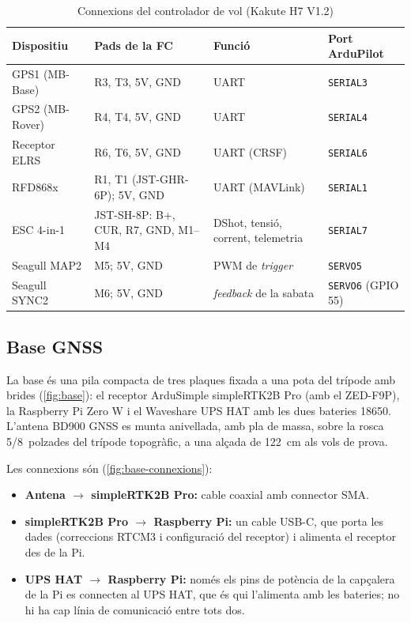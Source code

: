 \begin{table}[H]
    \centering
    \caption{Connexions del controlador de vol (Kakute H7 V1.2)}
    \label{tab:connexions}
    \small
    \begin{tabular}{P{3.2cm}P{3.9cm}P{3.5cm}P{2.6cm}}
        \toprule
        Dispositiu & Pads de la FC & Funció & Port ArduPilot \\
        \midrule
        GPS1 (MB-Base) & R3, T3, 5V, GND & UART & \texttt{SERIAL3} \\
        GPS2 (MB-Rover) & R4, T4, 5V, GND & UART & \texttt{SERIAL4} \\
        Receptor ELRS & R6, T6, 5V, GND & UART (CRSF) & \texttt{SERIAL6} \\
        RFD868x & R1, T1 (JST-GHR-6P); 5V, GND & UART (MAVLink) & \texttt{SERIAL1} \\
        ESC 4-in-1 & JST-SH-8P: B+, CUR, R7, GND, M1--M4 & DShot, tensió, corrent, telemetria & \texttt{SERIAL7} \\
        Seagull MAP2 & M5; 5V, GND & PWM de \emph{trigger} & \texttt{SERVO5} \\
        Seagull SYNC2 & M6; 5V, GND & \emph{feedback} de la sabata & \texttt{SERVO6} (GPIO 55) \\
        \bottomrule
    \end{tabular}
\end{table}

\subsection{Base GNSS}
\label{subsec:muntatge-base}

La base és una pila compacta de tres plaques fixada a una pota del trípode amb brides (\cref{fig:base}): el receptor ArduSimple simpleRTK2B Pro (amb el ZED-F9P), la Raspberry Pi Zero W i el Waveshare UPS HAT amb les dues bateries 18650. L'antena BD900 GNSS es munta anivellada, amb pla de massa, sobre la rosca 5/8~polzades del trípode topogràfic, a una alçada de 122~cm als vols de prova.

Les connexions són (\cref{fig:base-connexions}):
\begin{itemize}
    \item \textbf{Antena $\rightarrow$ simpleRTK2B Pro:} cable coaxial amb connector SMA.
    \item \textbf{simpleRTK2B Pro $\rightarrow$ Raspberry Pi:} un cable USB-C, que porta les dades (correccions RTCM3 i configuració del receptor) i alimenta el receptor des de la Pi.
    \item \textbf{UPS HAT $\rightarrow$ Raspberry Pi:} només els pins de potència de la capçalera de la Pi es connecten al UPS HAT, que és qui l'alimenta amb les bateries; no hi ha cap línia de comunicació entre tots dos.
\end{itemize}


